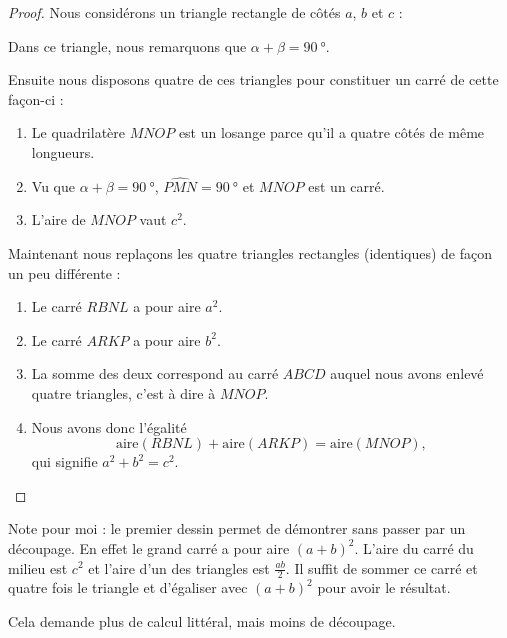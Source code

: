 \begin{proof}

    Nous considérons un triangle rectangle de côtés \( a\), \( b\) et \( c\) :
\begin{center}
   
\end{center}

Dans ce triangle, nous remarquons que \( \alpha+\beta=\SI{90}{\degree}\).

Ensuite nous disposons quatre de ces triangles pour constituer un carré de cette façon-ci :
\begin{center}
   
\end{center}


\begin{enumerate}
    \item
        Le quadrilatère \( MNOP\) est un losange parce qu'il a quatre côtés de même longueurs.
    \item
        Vu que \( \alpha+\beta=\SI{90}{\degree}\), \( \widehat{PMN}=\SI{90}{\degree}\) et \( MNOP\) est un carré.
    \item
        L'aire de \( MNOP\) vaut \( c^2\).
\end{enumerate}

Maintenant nous replaçons les quatre triangles rectangles (identiques) de façon un peu différente :

\begin{center}
   
\end{center}

\begin{enumerate}
    \item
        Le carré \( RBNL\) a pour aire \( a^2\).
    \item
        Le carré \( ARKP\) a pour aire \( b^2\).
    \item
        La somme des deux correspond au carré \( ABCD\) auquel nous avons enlevé quatre triangles, c'est à dire à \( MNOP\).
    \item
        Nous avons donc l'égalité
        \begin{equation}
            \text{aire}(RBNL)+\text{aire}(ARKP)=\text{aire}(MNOP),
        \end{equation}
        qui signifie \( a^2+b^2=c^2\).
\end{enumerate}

\end{proof}

\begin{remark}
    Note pour moi : le premier dessin permet de démontrer sans passer par un découpage. En effet le grand carré a pour aire \( (a+b)^2\). L'aire du carré du milieu est \( c^2\) et l'aire d'un des triangles est \( \frac{ ab }{2}\). Il suffit de sommer ce carré et quatre fois le triangle et d'égaliser avec \( (a+b)^2\) pour avoir le résultat.

    Cela demande plus de calcul littéral, mais moins de découpage.
\end{remark}

